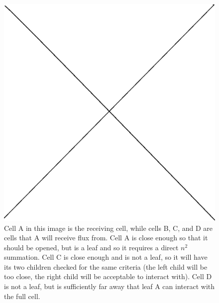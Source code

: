 \begin{figure}
\includegraphics[width=\textwidth]{graphics/placeholder.eps}
\caption[The opening angle criteria.]{Cell A in this image is the receiving cell, while cells B, C, and D are cells that A will receive flux from. Cell A is close enough so that it should be opened, but is a leaf and so it requires a direct $n^2$ summation. Cell C is close enough and is not a leaf, so it will have its two children checked for the same criteria (the left child will be too close, the right child will be acceptable to interact with). Cell D is not a leaf, but is sufficiently far away that leaf A can interact with the full cell.}
\label{fig:openinganglecriteria}
\end{figure}

